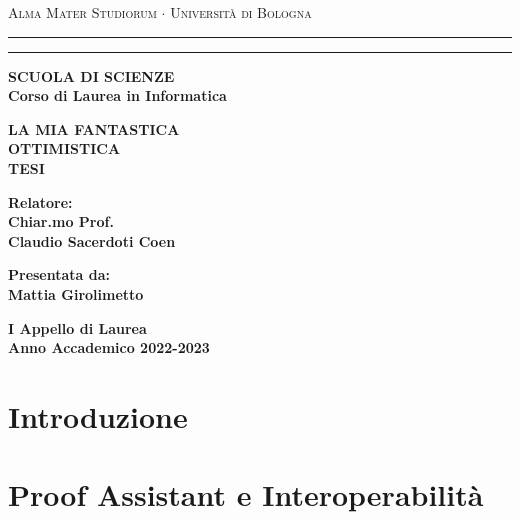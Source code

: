 \documentclass[12pt,a4paper]{report}
\begin{document}
\begin{titlepage}
  \begin{center}
    {{
      \Large{\textsc{Alma Mater Studiorum $\cdot$ Universit\`a di Bologna}}
    }} \rule[0.1cm]{15.8cm}{0.1mm}
    \rule[0.5cm]{15.8cm}{0.6mm}
    {\small{\bf SCUOLA DI SCIENZE\\
    Corso di Laurea in Informatica}}
  \end{center}
  \vspace{15mm}
  \begin{center}
    {\LARGE{\bf LA MIA FANTASTICA}}\\
    \vspace{3mm}
    {\LARGE{\bf OTTIMISTICA}}\\
    \vspace{3mm}
    {\LARGE{\bf TESI}}\\
  \end{center}
  \vspace{40mm}
  \par
  \noindent
  \begin{minipage}[t]{0.47\textwidth}
  {\large{\bf Relatore:\\
  Chiar.mo Prof.\\ %
  Claudio Sacerdoti Coen}}
  \end{minipage}
  \hfill
  \begin{minipage}[t]{0.47\textwidth}\raggedleft
  {\large{\bf Presentata da:\\
  Mattia Girolimetto}}
  \end{minipage}
  \vspace{20mm}
  \begin{center}
  {\large{\bf I Appello di Laurea\\%
  Anno Accademico 2022-2023}}%
  \end{center}
\end{titlepage}


\begin{abstract}
\end{abstract}

\tableofcontents

\chapter{Introduzione}

\chapter{Proof Assistant e Interoperabilità}
\end{document}
